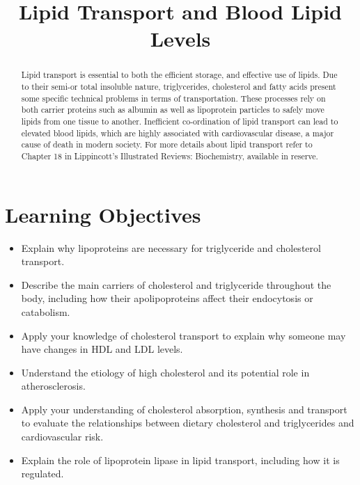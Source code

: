 \documentclass{tufte-handout}
\title{Lipid Transport and Blood Lipid Levels}
\author{}
\date{}  %
\begin{document}
\maketitle%

\begin{abstract}
\noindent  Lipid transport is essential to both the efficient storage, and effective use of lipids.  Due to their semi-or total insoluble nature, triglycerides, cholesterol and fatty acids present some specific technical problems in terms of transportation.  These processes rely on both carrier proteins such as albumin as well as lipoprotein particles to safely move lipids from one tissue to another.  Inefficient co-ordination of lipid transport can lead to elevated blood lipids, which are highly associated with cardiovascular disease, a major cause of death in modern society.  For more details about lipid transport refer to Chapter 18 in Lippincott's Illustrated Reviews: Biochemistry, available in reserve\cite{Ferrier2017}.
\end{abstract}

\tableofcontents

\pagebreak
\section{Learning Objectives}

\begin{itemize}
\item Explain why lipoproteins are necessary for triglyceride and cholesterol transport.
\item Describe the main carriers of cholesterol and triglyceride throughout the body, including how their apolipoproteins affect their endocytosis or catabolism.
\item Apply your knowledge of cholesterol transport to explain why someone may have changes in HDL and LDL levels.
\item Understand the etiology of high cholesterol and its potential role in atherosclerosis.  
\item Apply your understanding of cholesterol absorption, synthesis and transport to evaluate the relationships between dietary cholesterol and triglycerides and cardiovascular risk.
\item Explain the role of lipoprotein lipase in lipid transport, including how it is regulated.

\end{itemize}
\end{document}
